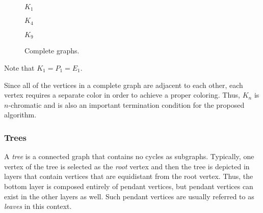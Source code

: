 \begin{figure}[H]
  \begin{minipage}{1.75in}
    \centering

    \bigskip

    \(K_1\)
  \end{minipage}
  \begin{minipage}{1.75in}
    \centering

    \bigskip

    \(K_4\)
  \end{minipage}
  \begin{minipage}{1.75in}
    \centering

    \bigskip

    \(K_9\)
  \end{minipage}
  \caption{Complete graphs.}
  \label{fig:complete}
\end{figure}

Note that \(K_1=P_1=E_1\).

Since all of the vertices in a complete graph are adjacent to each other, each vertex requires a separate color in
order to achieve a proper coloring.  Thus, \(K_n\) is \(n\)-chromatic and is also an important termination
condition for the proposed algorithm.

\subsubsection{Trees}\label{sec:sub:sub:trees}

A \emph{tree} is a connected graph that contains no cycles as subgraphs.  Typically, one vertex of the tree is
selected as the \emph{root} vertex and then the tree is depicted in layers that contain vertices that are
equidistant from the root vertex.  Thus, the bottom layer is composed entirely of pendant vertices, but pendant
vertices can exist in the other layers as well.  Such pendant vertices are usually referred to as \emph{leaves} in
this context.


